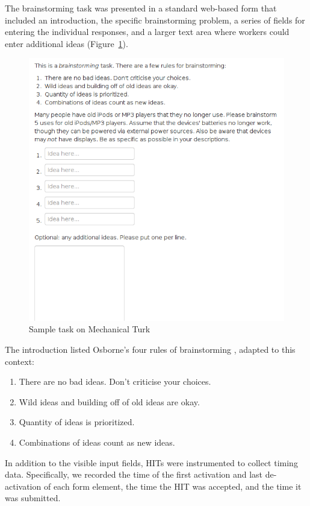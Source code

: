 The brainstorming task was presented in a standard web-based form that included an introduction, the specific brainstorming problem, a series of fields for entering the individual responses, and a larger text area where workers could enter additional ideas (Figure~\ref{fig:sample_task}).

\begin{figure}[h!]
    \centering
    \includegraphics[width=0.9\columnwidth]{sample_task}
    \caption{Sample task on Mechanical Turk}
    \label{fig:sample_task}
\end{figure}

The introduction listed Osborne's four rules of brainstorming \cite{osborn_applied_1957}, adapted to this context:

\begin{enumerate}
\item There are no bad ideas. Don't criticise your choices.
\item Wild ideas and building off of old ideas are okay.
\item Quantity of ideas is prioritized.
\item Combinations of ideas count as new ideas.
\end{enumerate}

In addition to the visible input fields, HITs were instrumented to collect timing data. Specifically, we recorded the time of the first activation and last de-activation of each form element, the time the HIT was accepted, and the time it was submitted.

